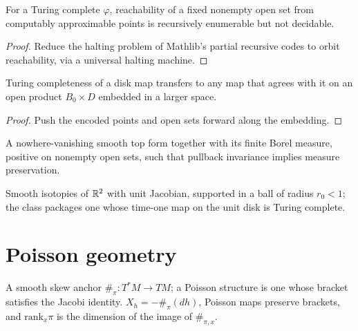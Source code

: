 \begin{theorem}
\label{thm_undecidable_general}
\leanok
{}
For a Turing complete $\varphi$, reachability of a fixed nonempty open set from computably
approximable points is recursively enumerable but not decidable.
\end{theorem}
\begin{proof}\leanok
Reduce the halting problem of Mathlib's partial recursive codes to orbit reachability, via a
universal halting machine.
\end{proof}

\begin{lemma}
\label{lem_transfer}
\leanok
{}
Turing completeness of a disk map transfers to any map that agrees with it on an open product
$B_0\times D$ embedded in a larger space.
\end{lemma}
\begin{proof}\leanok
Push the encoded points and open sets forward along the embedding.
\end{proof}

\begin{definition}
\label{def_volume}
\leanok
A nowhere-vanishing smooth top form together with its finite Borel measure, positive on nonempty
open sets, such that pullback invariance implies measure preservation.
\end{definition}

\begin{definition}
\label{def_disk_isotopy}
\leanok
{}
Smooth isotopies of $\mathbb{R}^2$ with unit Jacobian, supported in a ball of radius $r_0<1$; the class
packages one whose time-one map on the unit disk is Turing complete.
\end{definition}

\chapter{Poisson geometry}
\label{chap_poisson}

\begin{definition}
\label{def_poisson}
\leanok
A smooth skew anchor $\#_\pi\colon T^*M\to TM$; a Poisson structure is one whose bracket satisfies
the Jacobi identity. $X_h=-\#_\pi(dh)$, Poisson maps preserve brackets, and $\mathrm{rank}_x\pi$
is the dimension of the image of $\#_{\pi,x}$.
\end{definition}

